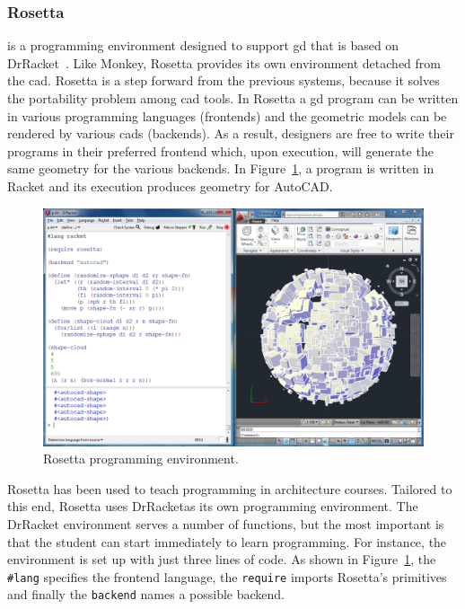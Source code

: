 \subsubsection{Rosetta~\cite{lopes2011portable}} is a programming environment designed to support \ac{gd} that is based on DrRacket~\cite{findler2002drscheme}. Like Monkey, Rosetta provides its own environment detached from the \ac{cad}. Rosetta is a step forward from the previous systems, because it solves the portability problem among \ac{cad} tools. In Rosetta a \ac{gd} program can be written in various programming languages (frontends) and the geometric models can be rendered by various \ac{cad}s (backends). As a result, designers are free to write their programs in their preferred frontend which, upon execution, will generate the same geometry for the various backends. In Figure~\ref{fig:rosetta}, a program is written in Racket and its execution produces geometry for AutoCAD.

\begin{figure}[!htbp]
\vspace{-5pt}
  \centering
  \includegraphics[width=1.0\textwidth]{img/rosetta1}
  \vspace{-20pt}
    \caption{Rosetta programming environment.}  
  \label{fig:rosetta}
  \vspace{-10pt}
\end{figure} 

Rosetta has been used to teach programming in architecture courses. Tailored to this end, Rosetta uses DrRacketas its own programming environment. The DrRacket environment serves a number of functions, but the most important is that the student can start immediately to learn programming. For instance, the environment is set up with just three lines of code. As shown in Figure~\ref{fig:rosetta}, the \texttt{\#lang} specifies the frontend language, the \texttt{require} imports Rosetta's primitives and finally the \texttt{backend} names a possible backend.

